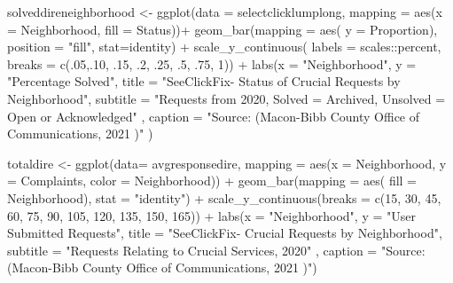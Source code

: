 \documentclass[
]{article}
\newenvironment{Shaded}{\begin{snugshade}}{\end{snugshade}}
\newcommand{\AttributeTok}[1]{\textcolor[rgb]{0.77,0.63,0.00}{#1}}
\newcommand{\DecValTok}[1]{\textcolor[rgb]{0.00,0.00,0.81}{#1}}
\newcommand{\FunctionTok}[1]{\textcolor[rgb]{0.00,0.00,0.00}{#1}}
\newcommand{\NormalTok}[1]{#1}
\newcommand{\OtherTok}[1]{\textcolor[rgb]{0.56,0.35,0.01}{#1}}
\newcommand{\SpecialCharTok}[1]{\textcolor[rgb]{0.00,0.00,0.00}{#1}}
\newcommand{\StringTok}[1]{\textcolor[rgb]{0.31,0.60,0.02}{#1}}
\begin{document}
\begin{Shaded}
\begin{Highlighting}[]
\NormalTok{solveddireneighborhood }\OtherTok{\textless{}{-}} \FunctionTok{ggplot}\NormalTok{(}\AttributeTok{data =}\NormalTok{ selectclicklumplong, }\AttributeTok{mapping =} \FunctionTok{aes}\NormalTok{(}\AttributeTok{x =}\NormalTok{ Neighborhood, }\AttributeTok{fill =}\NormalTok{ Status))}\SpecialCharTok{+}
 \FunctionTok{geom\_bar}\NormalTok{(}\AttributeTok{mapping =} \FunctionTok{aes}\NormalTok{( }\AttributeTok{y =}\NormalTok{ Proportion), }\AttributeTok{position =} \StringTok{"fill"}\NormalTok{, }\AttributeTok{stat=}\StringTok{\textquotesingle{}identity\textquotesingle{}}\NormalTok{)  }\SpecialCharTok{+} 
  \FunctionTok{scale\_y\_continuous}\NormalTok{(}
   \AttributeTok{labels =}\NormalTok{ scales}\SpecialCharTok{::}\NormalTok{percent, }
      \AttributeTok{breaks =} \FunctionTok{c}\NormalTok{(.}\DecValTok{05}\NormalTok{,.}\DecValTok{10}\NormalTok{, .}\DecValTok{15}\NormalTok{, .}\DecValTok{2}\NormalTok{, .}\DecValTok{25}\NormalTok{, .}\DecValTok{5}\NormalTok{, .}\DecValTok{75}\NormalTok{, }\DecValTok{1}\NormalTok{))  }\SpecialCharTok{+}
  \FunctionTok{labs}\NormalTok{(}\AttributeTok{x =} \StringTok{"Neighborhood"}\NormalTok{, }\AttributeTok{y =} \StringTok{"Percentage Solved"}\NormalTok{,}
     \AttributeTok{title =} \StringTok{"SeeClickFix{-} Status of Crucial Requests by Neighborhood"}\NormalTok{,}
     \AttributeTok{subtitle =} \StringTok{"Requests from 2020, Solved = Archived, Unsolved = Open or Acknowledged"}\NormalTok{ ,}
     \AttributeTok{caption =} \StringTok{"Source: (Macon{-}Bibb County Office of Communications, 2021 )"}\NormalTok{ ) }


\NormalTok{totaldire }\OtherTok{\textless{}{-}} \FunctionTok{ggplot}\NormalTok{(}\AttributeTok{data=}\NormalTok{ avgresponsedire, }\AttributeTok{mapping =} \FunctionTok{aes}\NormalTok{(}\AttributeTok{x =}\NormalTok{ Neighborhood, }\AttributeTok{y =}\NormalTok{ Complaints, }\AttributeTok{color =}\NormalTok{ Neighborhood)) }\SpecialCharTok{+}
  \FunctionTok{geom\_bar}\NormalTok{(}\AttributeTok{mapping =} \FunctionTok{aes}\NormalTok{( }\AttributeTok{fill =}\NormalTok{ Neighborhood), }\AttributeTok{stat =} \StringTok{"identity"}\NormalTok{) }\SpecialCharTok{+} \FunctionTok{scale\_y\_continuous}\NormalTok{(}\AttributeTok{breaks =} \FunctionTok{c}\NormalTok{(}\DecValTok{15}\NormalTok{, }\DecValTok{30}\NormalTok{, }\DecValTok{45}\NormalTok{, }\DecValTok{60}\NormalTok{, }\DecValTok{75}\NormalTok{, }\DecValTok{90}\NormalTok{, }\DecValTok{105}\NormalTok{, }\DecValTok{120}\NormalTok{, }\DecValTok{135}\NormalTok{, }\DecValTok{150}\NormalTok{, }\DecValTok{165}\NormalTok{)) }\SpecialCharTok{+}
  \FunctionTok{labs}\NormalTok{(}\AttributeTok{x =} \StringTok{"Neighborhood"}\NormalTok{, }\AttributeTok{y =} \StringTok{"User Submitted Requests"}\NormalTok{,}
     \AttributeTok{title =} \StringTok{"SeeClickFix{-} Crucial Requests by Neighborhood"}\NormalTok{,}
     \AttributeTok{subtitle =} \StringTok{"Requests Relating to Crucial Services, 2020"}\NormalTok{ ,}
     \AttributeTok{caption =} \StringTok{"Source: (Macon{-}Bibb County Office of Communications, 2021 )"}\NormalTok{) }
  

\end{Highlighting}
\end{Shaded}
\end{document}
